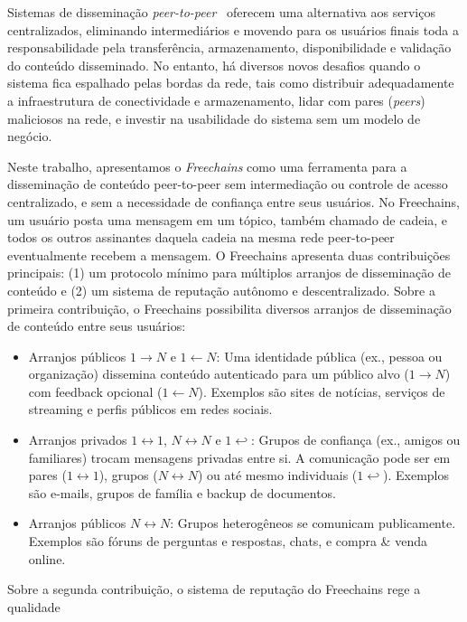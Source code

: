 \documentclass[12pt]{article}
\newcommand{\FC} {Freechains\xspace}
\newcommand{\Xon} {$1{\rightarrow}N$\xspace}
\newcommand{\Xno} {$1{\leftarrow}N$\xspace}
\newcommand{\Xnn} {$N{\leftrightarrow}N$\xspace}
\newcommand{\Xoo} {$1{\leftrightarrow}1$\xspace}
\newcommand{\Xo}  {$1{\hookleftarrow}$\xspace}
\begin{document}
Sistemas de disseminação \emph{peer-to-peer}~\cite{p2p.survey} oferecem uma
alternativa aos serviços centralizados, eliminando intermediários e movendo
para os usuários finais toda a responsabilidade pela transferência,
armazenamento, disponibilidade e validação do conteúdo disseminado.
No entanto, há diversos novos desafios quando o sistema fica espalhado pelas
bordas da rede, tais como distribuir adequadamente a infraestrutura de
conectividade e armazenamento, lidar com pares (\emph{peers}) maliciosos na
rede, e investir na usabilidade do sistema sem um modelo de negócio.

Neste trabalho, apresentamos o \emph{\FC} como uma ferramenta para a
disseminação de conteúdo peer-to-peer sem intermediação ou controle de acesso
centralizado, e sem a necessidade de confiança entre seus usuários.
No \FC, um usuário posta uma mensagem em um tópico, também chamado de
cadeia, e todos os outros assinantes daquela cadeia na mesma rede peer-to-peer
eventualmente recebem a mensagem.
O \FC apresenta duas contribuições principais: (1) um protocolo mínimo para
múltiplos arranjos de disseminação de conteúdo e (2) um sistema de reputação
autônomo e descentralizado.
%
Sobre a primeira contribuição, o \FC possibilita diversos arranjos de
disseminação de conteúdo entre seus usuários:
%
\begin{itemize}
\item Arranjos públicos \Xon e \Xno:
    Uma identidade pública (ex., pessoa ou organização) dissemina conteúdo
    autenticado para um público alvo (\Xon) com feedback opcional (\Xno).
    Exemplos são sites de notícias, serviços de streaming e perfis públicos em
    redes sociais.
\item Arranjos privados \Xoo, \Xnn e \Xo:
    Grupos de confiança (ex., amigos ou familiares) trocam mensagens privadas
    entre si.
    A comunicação pode ser em pares (\Xoo), grupos (\Xnn) ou até mesmo
    individuais (\Xo).
    Exemplos são e-mails, grupos de família e backup de documentos.
\item Arranjos públicos \Xnn:
    Grupos heterogêneos se comunicam publicamente. Exemplos são fóruns de
    perguntas e respostas, chats, e compra \& venda online.
\end{itemize}
%
%
Sobre a segunda contribuição, o sistema de reputação do \FC rege a qualidade
\end{document}

